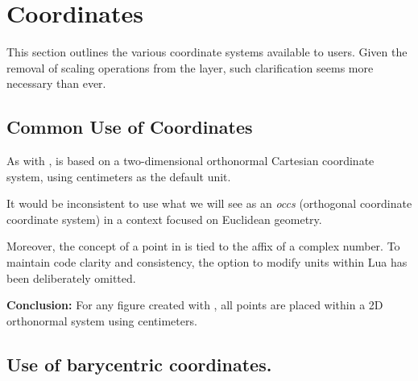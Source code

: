 \newpage\section{Coordinates}

This section outlines the various coordinate systems available to users. Given the removal of scaling operations from the  layer, such clarification seems more necessary than ever.

\subsection{Common Use of Coordinates}
As with ,  is based on a two-dimensional orthonormal Cartesian coordinate system, using centimeters as the default unit.

It would be inconsistent to use what we will see  as an \emph{occs} (orthogonal coordinate coordinate system) in a context focused on Euclidean geometry.

Moreover, the concept of a point in  is tied to the affix of a complex number. To maintain code clarity and consistency, the option to modify units within Lua has been deliberately omitted.

\medskip
\noindent
\textbf{Conclusion:} For any figure created with , all points are placed within a 2D orthonormal system using centimeters.


\subsection{Use of barycentric coordinates.}

